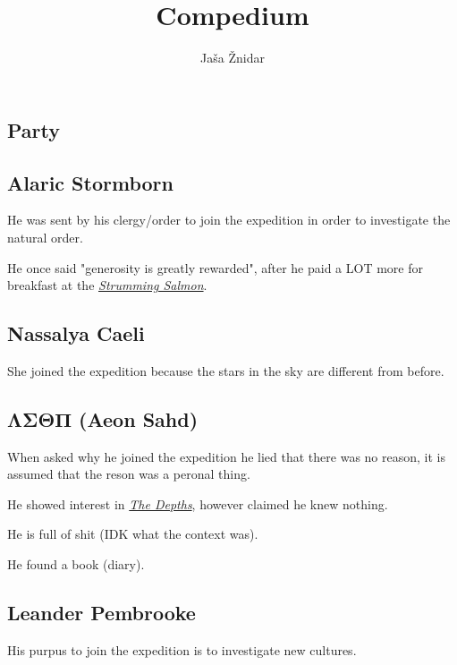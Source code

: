 \documentclass{article}
\title{Compedium}
\author{Jaša Žnidar}
\begin{document}
\maketitle

\begin{multicols}{2}

    \section{Party}
    \label{party}

    \subsection{Alaric Stormborn}
    \label{aleric}

    He was sent by his clergy/order to join the expedition in order to investigate the natural order.

    He once said "generosity is greatly rewarded", after he paid a LOT more for breakfast at the \hyperref[strumming_salmon]{\textit{Strumming Salmon}}.

    \subsection{Nassalya Caeli}
    \label{nassalya}

    She joined the expedition because the stars in the sky are different from before.


    \subsection{ΛΣΘΠ (Aeon Sahd)}
    \label{aeon}

    When asked why he joined the expedition he lied that there was no reason, it is assumed that the reson was a peronal thing.

    He showed interest in \hyperref[depths]{\textit{The Depths}}, however claimed he knew nothing.

    He is full of shit (IDK what the context was).

    He found a book (diary).

    \subsection{Leander Pembrooke}
    \label{leander}

    His purpus to join the expedition is to investigate new cultures.


\end{multicols}
\end{document}
